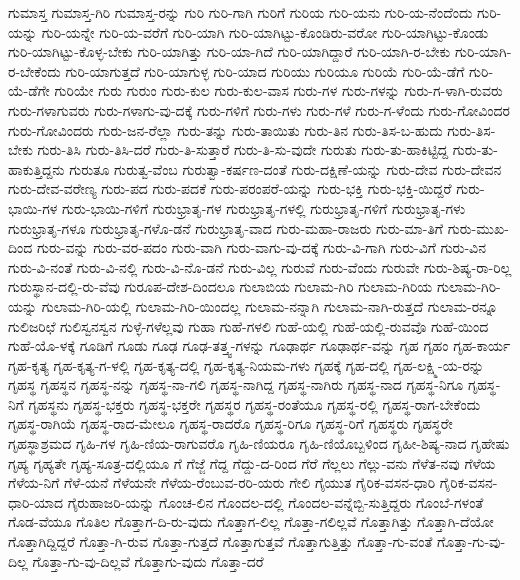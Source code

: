 ಗುಮಾಸ್ತ
ಗುಮಾಸ್ತ-ಗಿರಿ
ಗುಮಾಸ್ತ-ರನ್ನು
ಗುರಿ
ಗುರಿ-ಗಾಗಿ
ಗುರಿಗೆ
ಗುರಿಯ
ಗುರಿ-ಯನು
ಗುರಿ-ಯ-ನೆಂದೆಂದು
ಗುರಿ-ಯನ್ನು
ಗುರಿ-ಯನ್ನೇ
ಗುರಿ-ಯ-ವರೆಗೆ
ಗುರಿ-ಯಾಗಿ
ಗುರಿ-ಯಾಗಿಟ್ಟು-ಕೊಂಡಿರು-ವರೋ
ಗುರಿ-ಯಾಗಿಟ್ಟು-ಕೊಂಡು
ಗುರಿ-ಯಾಗಿಟ್ಟು-ಕೊಳ್ಳ-ಬೇಕು
ಗುರಿ-ಯಾಗಿತ್ತು
ಗುರಿ-ಯಾ-ಗಿದೆ
ಗುರಿ-ಯಾಗಿದ್ದಾರೆ
ಗುರಿ-ಯಾಗಿ-ರ-ಬೇಕು
ಗುರಿ-ಯಾಗಿ-ರ-ಬೇಕೆಂದು
ಗುರಿ-ಯಾಗುತ್ತದೆ
ಗುರಿ-ಯಾಗುಳ್ಳ
ಗುರಿ-ಯಾದ
ಗುರಿಯು
ಗುರಿಯೂ
ಗುರಿಯೆ
ಗುರಿ-ಯೆ-ಡೆಗೆ
ಗುರಿ-ಯೆ-ಡೆಗೇ
ಗುರಿಯೇ
ಗುರು
ಗುರುಂ
ಗುರು-ಕುಲ
ಗುರು-ಕುಲ-ವಾಸ
ಗುರು-ಗಳ
ಗುರು-ಗಳನ್ನು
ಗುರು-ಗ-ಳಾಗಿ-ರುವರು
ಗುರು-ಗಳಾಗುವರು
ಗುರು-ಗಳಾಗು-ವು-ದಕ್ಕೆ
ಗುರು-ಗಳಿಗೆ
ಗುರು-ಗಳು
ಗುರು-ಗಳೆ
ಗುರು-ಗ-ಳೆಂದು
ಗುರು-ಗೋವಿಂದರ
ಗುರು-ಗೋವಿಂದರು
ಗುರು-ಜನ-ರೆಲ್ಲಾ
ಗುರು-ತನ್ನು
ಗುರು-ತಾಯಿತು
ಗುರು-ತಿನ
ಗುರು-ತಿಸ-ಬ-ಹುದು
ಗುರು-ತಿಸ-ಬೇಕು
ಗುರು-ತಿಸಿ
ಗುರು-ತಿಸಿ-ದರೆ
ಗುರು-ತಿ-ಸುತ್ತಾರೆ
ಗುರು-ತಿ-ಸು-ವುದೇ
ಗುರುತು
ಗುರು-ತು-ಹಾಕಿಟ್ಟಿದ್ದ
ಗುರು-ತು-ಹಾಕುತ್ತಿದ್ದನು
ಗುರುತೂ
ಗುರುತ್ವ-ವೆಂಬ
ಗುರುತ್ವಾ-ಕರ್ಷಣ-ದಂತೆ
ಗುರು-ದಕ್ಷಿಣೆ-ಯನ್ನು
ಗುರು-ದೇವ
ಗುರು-ದೇವನ
ಗುರು-ದೇವ-ವರೇಣ್ಯ
ಗುರು-ಪದ
ಗುರು-ಪದಕೆ
ಗುರು-ಪರಂಪರೆ-ಯನ್ನು
ಗುರು-ಭಕ್ತಿ
ಗುರು-ಭಕ್ತಿ-ಯಿದ್ದರೆ
ಗುರು-ಭಾಯಿ-ಗಳ
ಗುರು-ಭಾಯಿ-ಗಳಿಗೆ
ಗುರುಭ್ರಾತೃ-ಗಳ
ಗುರುಭ್ರಾತೃ-ಗಳಲ್ಲಿ
ಗುರುಭ್ರಾತೃ-ಗಳಿಗೆ
ಗುರುಭ್ರಾತೃ-ಗಳು
ಗುರುಭ್ರಾತೃ-ಗಳೂ
ಗುರುಭ್ರಾತೃ-ಗಳೊ-ಡನೆ
ಗುರುಭ್ರಾತೃ-ವಾದ
ಗುರು-ಮಹಾ-ರಾಜರು
ಗುರು-ಮಾ-ತಿಗೆ
ಗುರು-ಮುಖ-ದಿಂದ
ಗುರು-ವನ್ನು
ಗುರು-ವರ-ಪದಂ
ಗುರು-ವಾಗಿ
ಗುರು-ವಾಗು-ವು-ದಕ್ಕೆ
ಗುರು-ವಿ-ಗಾಗಿ
ಗುರು-ವಿಗೆ
ಗುರು-ವಿನ
ಗುರು-ವಿ-ನಂತೆ
ಗುರು-ವಿ-ನಲ್ಲಿ
ಗುರು-ವಿ-ನೊ-ಡನೆ
ಗುರು-ವಿಲ್ಲ
ಗುರುವೆ
ಗುರು-ವೆಂದು
ಗುರುವೇ
ಗುರು-ಶಿಷ್ಯ-ರಾ-ರಿಲ್ಲ
ಗುರುಸ್ಥಾನ-ದಲ್ಲಿ-ರು-ವೆವು
ಗುರೂಪ-ದೇಶ-ದಿಂದಲೂ
ಗುಲಾಬಿಯ
ಗುಲಾಮ-ಗಿರಿ
ಗುಲಾಮ-ಗಿರಿಯ
ಗುಲಾಮ-ಗಿರಿ-ಯನ್ನು
ಗುಲಾಮ-ಗಿರಿ-ಯಲ್ಲಿ
ಗುಲಾಮ-ಗಿರಿ-ಯಿಂದಲ್ಲ
ಗುಲಾಮ-ನನ್ನಾಗಿ
ಗುಲಾಮ-ನಾಗಿ-ರುತ್ತದೆ
ಗುಲಾಮ-ರನ್ನೂ
ಗುಲಿಜರಿಛೆ
ಗುಲಿಸ್ವನಸ್ವನ
ಗುಳ್ಳೆ-ಗಳೆಲ್ಲವು
ಗುಹಾ
ಗುಹೆ-ಗಳಲಿ
ಗುಹೆ-ಯಲ್ಲಿ
ಗುಹೆ-ಯಲ್ಲಿ-ರುವವೊ
ಗುಹೆ-ಯಿಂದ
ಗುಹೆ-ಯೊ-ಳಕ್ಕೆ
ಗೂಡಿಗೆ
ಗೂಡು
ಗೂಢ
ಗೂಢ-ತತ್ತ್ವ-ಗಳನ್ನು
ಗೂಢಾರ್ಥ
ಗೂಢಾರ್ಥ-ವನ್ನು
ಗೃಹ
ಗೃಹಂ
ಗೃಹ-ಕಾರ್ಯ
ಗೃಹ-ಕೃತ್ಯ
ಗೃಹ-ಕೃತ್ಯ-ಗ-ಳಲ್ಲಿ
ಗೃಹ-ಕೃತ್ಯ-ದಲ್ಲಿ
ಗೃಹ-ಕೃತ್ಯ-ನಿಯಮ-ಗಳು
ಗೃಹಕ್ಕೆ
ಗೃಹ-ದಲ್ಲಿ
ಗೃಹ-ಲಕ್ಷ್ಮಿ-ಯ-ರನ್ನು
ಗೃಹಸ್ಥ
ಗೃಹಸ್ಥನ
ಗೃಹಸ್ಥ-ನನ್ನು
ಗೃಹಸ್ಥ-ನಾ-ಗಲಿ
ಗೃಹಸ್ಥ-ನಾಗಿದ್ದ
ಗೃಹಸ್ಥ-ನಾಗಿರು
ಗೃಹಸ್ಥ-ನಾದ
ಗೃಹಸ್ಥ-ನಿಗೂ
ಗೃಹಸ್ಥ-ನಿಗೆ
ಗೃಹಸ್ಥನು
ಗೃಹಸ್ಥ-ಭಕ್ತರು
ಗೃಹಸ್ಥ-ಭಕ್ತರೇ
ಗೃಹಸ್ಥರ
ಗೃಹಸ್ಥ-ರಂತೆಯೂ
ಗೃಹಸ್ಥ-ರಲ್ಲಿ
ಗೃಹಸ್ಥ-ರಾಗ-ಬೇಕೆಂದು
ಗೃಹಸ್ಥ-ರಾಗಿಯೆ
ಗೃಹಸ್ಥ-ರಾದ-ಮೇಲೂ
ಗೃಹಸ್ಥ-ರಾದರೊ
ಗೃಹಸ್ಥ-ರಿಗೂ
ಗೃಹಸ್ಥ-ರಿಗೆ
ಗೃಹಸ್ಥರು
ಗೃಹಸ್ಥರೇ
ಗೃಹಸ್ಥಾಶ್ರಮದ
ಗೃಹಿ-ಗಳ
ಗೃಹಿ-ಣಿಯ-ರಾಗುವರೊ
ಗೃಹಿ-ಣಿಯರೂ
ಗೃಹಿ-ಣಿಯೊಬ್ಬಳಿಂದ
ಗೃಹೀ-ಶಿಷ್ಯ-ನಾದ
ಗೃಹೇಷು
ಗೃಹ್ಯ
ಗೃಹ್ಯತೇ
ಗೃಹ್ಯ-ಸೂತ್ರ-ದಲ್ಲಿಯೂ
ಗೆ
ಗೆಜ್ಜೆ
ಗೆದ್ದ
ಗೆದ್ದು-ದ-ರಿಂದ
ಗೆರೆ
ಗೆಲ್ಲಲು
ಗೆಲ್ಲು-ವನು
ಗೆಳೆತ-ನವು
ಗೆಳೆಯ
ಗೆಳೆಯ-ನಿಗೆ
ಗೆಳೆ-ಯನೆ
ಗೆಳೆಯನೇ
ಗೆಳೆಯ-ರೆಂಬುವ-ರರಿ-ಯರು
ಗೇಲಿ
ಗೈಯುತ
ಗೈರಿಕ-ವಸನ-ಧಾರಿ
ಗೈರಿಕ-ವಸನ-ಧಾರಿ-ಯಾದ
ಗೈರುಹಾಜರಿ-ಯನ್ನು
ಗೊಂಚ-ಲಿನ
ಗೊಂದಲ-ದಲ್ಲಿ
ಗೊಂದಲ-ವನ್ನೆಬ್ಬಿ-ಸುತ್ತಿದ್ದರು
ಗೊಂಬೆ-ಗಳಂತೆ
ಗೊಡ-ವೆಯೂ
ಗೊತಿಲ
ಗೊತ್ತಾಗ-ದಿ-ರು-ವುದು
ಗೊತ್ತಾಗ-ಲಿಲ್ಲ
ಗೊತ್ತಾ-ಗಲಿಲ್ಲವೆ
ಗೊತ್ತಾಗಿತ್ತು
ಗೊತ್ತಾಗಿ-ದೆಯೋ
ಗೊತ್ತಾಗಿದ್ದಿದ್ದರೆ
ಗೊತ್ತಾ-ಗಿ-ರುವ
ಗೊತ್ತಾ-ಗುತ್ತದೆ
ಗೊತ್ತಾಗುತ್ತವೆ
ಗೊತ್ತಾಗುತ್ತಿತ್ತು
ಗೊತ್ತಾ-ಗು-ವಂತೆ
ಗೊತ್ತಾ-ಗು-ವು-ದಿಲ್ಲ
ಗೊತ್ತಾ-ಗು-ವು-ದಿಲ್ಲವೆ
ಗೊತ್ತಾಗು-ವುದು
ಗೊತ್ತಾ-ದರೆ
